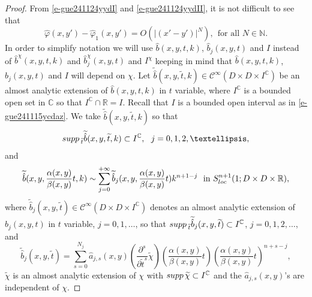 \documentclass[12pt]{amsart}
\theoremstyle{definition}
\theoremstyle{named}
\numberwithin{equation}{subsection}
\newcommand{\pr}{\partial}
\newcommand{\Td}{\widetilde}
\newcommand{\abs}[1]{\left\vert#1\right\vert}
\def\cC{\mathscr{C}}
\begin{document}
\begin{proof}
From \eqref{e-gue241124yydI} and \eqref{e-gue241124yydII}, it is not difficult to see that 
\begin{equation}\label{e-gue241124yydr}
\hat\varphi(x,y')-\hat\varphi_1(x,y')=O(\abs{(x'-y')}^N),\ \ \mbox{for all $N\in\mathbb N$}. 
\end{equation}
In order to simplify notation we will use \(\hat b(x,y,t,k)\), \(\hat b_j(x,y,t)\) and \(I\) instead of \(\hat b^\chi(x,y,t,k)\) and \(\hat b^\chi_j(x,y,t)\) and \(I^\chi\) keeping in mind that \(\hat b(x,y,t,k)\), \(\hat b_j(x,y,t)\) and \(I\) will depend on \(\chi\).
 Let $\Td{\hat b}(x,y,\Td t,k)\in\cC^\infty(D\times D\times I^{\mathbb C})$ be an almost analytic extension of $\hat b(x,y,t,k)$ in $t$ variable, where $I^{\mathbb C}$ is a bounded open set in $\mathbb C$ so that $I^{\mathbb C}\cap\mathbb R=I$. Recall that $I$ is a bounded open interval as in \eqref{e-gue241115ycdaz}.
 We take $\Td{\hat b}(x,y,\Td t,k)$ so that 
 \begin{equation}\label{e-gue241115ycdazz}
\begin{split}
{\rm supp\,}_{\Td t}\Td{\hat b}(x,y,\Td t,k)\subset I^{\mathbb C},\ \ j=0,1,2,\ldots, 
\end{split}
\end{equation}
and 
\begin{equation}\label{e-gue241124yydm}
\Td{\hat b}(x,y,\frac{\alpha(x,y)}{\beta(x,y)}t,k)\sim\sum^{+\infty}_{j=0}\Td{\hat b}_j(x,y,\frac{\alpha(x,y)}{\beta(x,y)}t)k^{n+1-j}\ \ \mbox{in $S^{n+1}_{{\rm loc\,}}(1;D\times D\times\mathbb R)$},
\end{equation}
 where $\Td{\hat b}_j(x,y,\Td t)\in\cC^\infty(D\times D\times I^{\mathbb C})$ denotes an almost analytic extension of $\hat b_j(x,y,t)$ in $t$ variable, $j=0,1,\ldots$, so that ${\rm supp\,}_{\Td t}\Td{\hat b}_j(x,y,\Td t)\subset I^{\mathbb C}$, $j=0,1,2,\ldots$, and 
 \begin{equation}\label{e-gue241124yydn}
\Td{\hat b}_j(x,y,\Td t)=\sum^{N_j}_{s=0}\hat a_{j,s}(x,y)(\frac{\pr^s}{\pr\Td t^s}\Td\chi)(\frac{\alpha(x,y)}{\beta(x,y)}t)(\frac{\alpha(x,y)}{\beta(x,y)}t)^{n+s-j}, 
 \end{equation}
 $\Td\chi$ is an almost analytic extension of $\chi$ with ${\rm supp\,}\Td\chi\subset I^{\mathbb C}$ and the \(\hat a_{j,s}(x,y)\)'s are independent of \(\chi\).


\end{proof}
\end{document}
